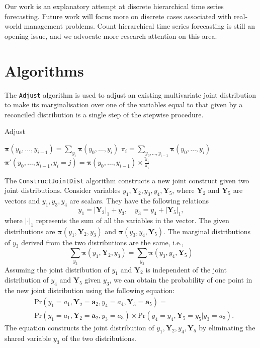 \documentclass[a4paper,review,12pt,authoryear]{elsarticle}
\let\code=\texttt
\newcommand{\bY}{\mathbf{Y}}
\newcommand{\bpi}{\bm{\pi}}
\begin{document}
     Our work is an explanatory attempt at discrete hierarchical time series forecasting. 
     Future work will focus more on discrete cases associated with real-world management problems.
     Count hierarchical time series forecasting is still an opening issue,
     and we advocate more research attention on this area.


\newpage

\appendix

\section{Algorithms}
\label{appendix:adjust}

The \code{Adjust} algorithm is used to adjust an existing multivariate joint distribution to make its marginalisation over one of the variables equal to that given by a reconciled distribution is a single step of the stepwise procedure.

\begin{algorithm}[H]
  \label{alg:adjust}
  \caption{Adjust}
  \Input{$\bpi(y_0,y_1,\dots,y_i), \tilde\pi_i, y_i \in \{0,1,\dots,k_i\}$}

  $\bpi(y_0,\dots,y_{i-1}) = \sum_{y_i}\bpi(y_0,\dots,y_i)$\;
  $\pi_i = \sum_{y_0,\dots,y_{i-1}}\bpi(y_0,\dots,y_i)$ \;
   {
    $\bpi'(y_0,\dots,y_{i-1}, y_i=j) = \bpi(y_0,\dots,y_{i-1}) \times \frac{\tilde\pi_i}{\pi_i}$ \;
  }

  \Output{$\bpi'(y_0,\dots,y_i)$}
  
 \end{algorithm}


 The \code{ConstructJointDist} algorithm constructs a new joint construct given two joint distributions. 
 Consider variables $y_1, \bY_2, y_3, y_4, \bY_5$, where $\bY_2$ and $\bY_5$ are vectors and $y_1, y_3, y_4$ are scalars. 
 They have the following relations
 \[
  y_1 = |\bY_2|_1 + y_3, \quad y_3 = y_4 + |\bY_5|_1,
 \]
 where $|\cdot|_1$ represents the sum of all the variables in the vector.
 The given distributions are $\bpi(y_1, \bY_2, y_3)$ and $\bpi(y_3, y_4, \bY_5)$.
 The marginal distributions of $y_3$ derived from the two distributions are the same, i.e.,
 \[
  \sum_{y_3} \bpi(y_1, \bY_2, y_3) = \sum_{y_3}\bpi(y_3, y_4, \bY_5)
\]
 Assuming the joint distribution of $y_1$ and $\bY_2$ is independent of the joint distribution of $y_4$ and $\bY_5$ given $y_3$, we can obtain the probability of one point in the new joint distribution using the following equation: \[
   \begin{aligned}
  &\text{Pr}(y_1=a_1,\bY_2=\mathbf{a}_2, y_4=a_4, \bY_5 = \mathbf{a}_5) =\\ &\text{Pr} (y_1=a_1,\bY_2=\mathbf{a}_2,y_3=a_3) \times \text{Pr}(y_4=y_4,\bY_5=y_5|y_3=a_3).
   \end{aligned}
 \]
 The equation constructs the joint distribution of $y_1, \bY_2, y_4, \bY_5$ by eliminating the shared variable $y_3$ of the two distributions.

\newpage



\end{document}
